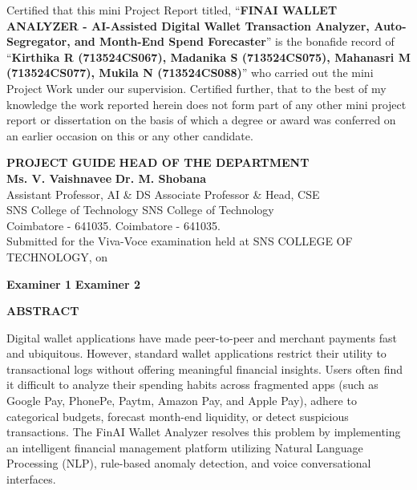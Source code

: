 \documentclass[12pt,a4paper]{report}
\begin{document}
\vspace{0.6cm}
Certified that this mini Project Report titled, ``\textbf{FINAI WALLET ANALYZER - AI-Assisted Digital Wallet Transaction Analyzer, Auto-Segregator, and Month-End Spend Forecaster}'' is the bonafide record of ``\textbf{Kirthika R (713524CS067), Madanika S (713524CS075), Mahanasri M (713524CS077), Mukila N (713524CS088)}'' who carried out the mini Project Work under our supervision. Certified further, that to the best of my knowledge the work reported herein does not form part of any other mini project report or dissertation on the basis of which a degree or award was conferred on an earlier occasion on this or any other candidate.

\vspace{2.5cm}
\noindent
\textbf{PROJECT GUIDE} \hfill \textbf{HEAD OF THE DEPARTMENT}\\
\textbf{Ms. V. Vaishnavee} \hfill \textbf{Dr. M. Shobana}\\
Assistant Professor, AI \& DS \hfill Associate Professor \& Head, CSE\\
SNS College of Technology \hfill SNS College of Technology\\
Coimbatore - 641035. \hfill Coimbatore - 641035.\\

\vspace{1.5cm}
\noindent
Submitted for the Viva-Voce examination held at SNS COLLEGE OF TECHNOLOGY, on \dotfill

\vspace{1.5cm}
\noindent
\textbf{Examiner 1} \hfill \textbf{Examiner 2}

\newpage
\begin{center}
{\Large \textbf{ABSTRACT}\par}
\end{center}
\vspace{0.5cm}
Digital wallet applications have made peer-to-peer and merchant payments fast and ubiquitous. However, standard wallet applications restrict their utility to transactional logs without offering meaningful financial insights. Users often find it difficult to analyze their spending habits across fragmented apps (such as Google Pay, PhonePe, Paytm, Amazon Pay, and Apple Pay), adhere to categorical budgets, forecast month-end liquidity, or detect suspicious transactions. The FinAI Wallet Analyzer resolves this problem by implementing an intelligent financial management platform utilizing Natural Language Processing (NLP), rule-based anomaly detection, and voice conversational interfaces.
\end{document}
